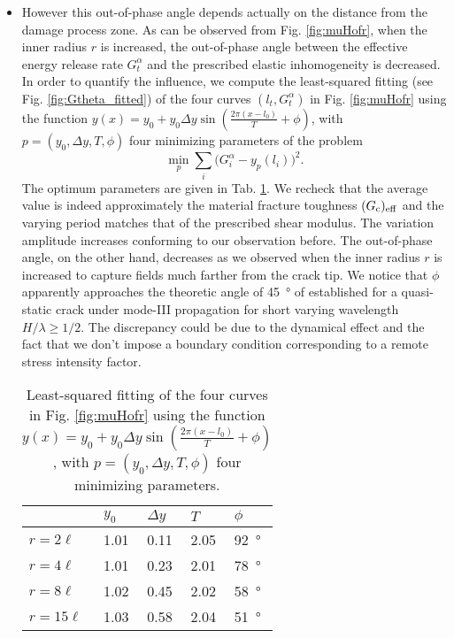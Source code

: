 \begin{itemize}
\item However this out-of-phase angle depends actually on the distance from the damage process zone. As can be observed from Fig. \ref{fig:muHofr}, when the inner radius $r$ is increased, the out-of-phase angle between the effective energy release rate $G^\alpha_t$ and the prescribed elastic inhomogeneity is decreased. In order to quantify the influence, we compute the least-squared fitting (see Fig. \ref {fig:Gtheta_fitted}) of the four curves $(l_t,G^\alpha_t)$ in Fig. \ref{fig:muHofr} using the function $y(x)=y_0+y_0\Delta y\sin(\frac{2\pi(x-l_0)}{T}+\phi)$, with $p=(y_0, \Delta y, T, \phi)$ four minimizing parameters of the problem
\[
\min_p\sum_i\bigl(G^\alpha_i-y_p(l_i)\bigr)^2.
\]
The optimum parameters are given in Tab. \ref{tab:fitting}. We recheck that the average value is indeed approximately the material fracture toughness $(G_\mathrm{c})_\mathrm{eff}$ and the varying period matches that of the prescribed shear modulus. The variation amplitude increases conforming to our observation before. The out-of-phase angle, on the other hand, decreases as we observed when the inner radius $r$ is increased to capture fields much farther from the crack tip. We notice that $\phi$ apparently approaches the theoretic angle of \SI{45}{\degree} of \cite{Gao:1991} established for a quasi-static crack under mode-\RN{3} propagation for short varying wavelength $H/\lambda\geq1/2$. The discrepancy could be due to the dynamical effect and the fact that we don't impose a boundary condition corresponding to a remote stress intensity factor.
\begin{table}[htbp]
\centering
\caption{Least-squared fitting of the four curves in Fig. \ref{fig:muHofr} using the function $y(x)=y_0+y_0\Delta y\sin(\frac{2\pi(x-l_0)}{T}+\phi)$, with $p=(y_0, \Delta y, T, \phi)$ four minimizing parameters.} \label{tab:fitting}
\begin{tabular}{lllll} \toprule
& $y_0$ & $\Delta y$ & $T$ & $\phi$ \\ \midrule
$r=2\ell$ & 1.01 & 0.11 & 2.05 & \SI{92}{\degree} \\
$r=4\ell$ & 1.01 & 0.23 & 2.01 & \SI{78}{\degree} \\
$r=8\ell$ & 1.02 & 0.45 & 2.02 & \SI{58}{\degree} \\
$r=15\ell$ & 1.03 & 0.58 & 2.04 & \SI{51}{\degree} \\ \bottomrule
\end{tabular}
\end{table}
\end{itemize}

